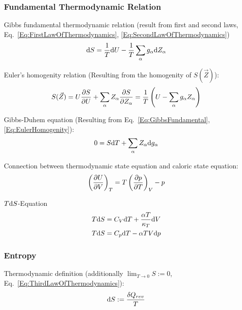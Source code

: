 		\subsubsection{Fundamental Thermodynamic Relation}
			\noindent
			Gibbs fundamental thermodynamic relation (result from first and second laws, Eq.~\ref{Eq:FirstLawOfThermodynamics}, \ref{Eq:SecondLawOfThermodynamics})
			\begin{equation}
				\label{Eq:GibbsFundamental}
				\mathrm{d} S = \frac{1}{T} \mathrm{d} U - \frac{1}{T} \sum_{\alpha} g_\alpha \mathrm{d} Z_\alpha
			\end{equation}

			\noindent
			Euler's homogenity relation (Resulting from the homogenity of $S(\vec{Z})$):
			\begin{equation}
				\label{Eq:EulerHomogenity}
				S(\vec{Z}) = U\frac{\partial S}{\partial U} + \sum_\alpha Z_\alpha\frac{\partial S}{\partial Z_\alpha}
				= \frac{1}{T} \left( U-\sum_\alpha g_\alpha Z_\alpha \right)
			\end{equation}

			\noindent
			Gibbs-Duhem equation (Resulting from Eq.~\ref{Eq:GibbsFundamental}, \ref{Eq:EulerHomogenity}):
			\begin{equation}
				0 = S \mathrm{d} T + \sum_\alpha Z_\alpha \mathrm{d} g_\alpha
			\end{equation}

			\noindent
			Connection between thermodynamic state equation and caloric state equation:
			\begin{equation}
				\left(\frac{\partial U}{\partial V}\right)_T = T\left(\frac{\partial p}{\partial T}\right)_V - p
			\end{equation}

			\noindent
			$T \mathrm{d} S$-Equation
			\begin{equation}
				\begin{aligned}
					T \mathrm{d} S &= C_V \mathrm{d} T + \frac{\alpha T}{\kappa_T} \mathrm{d} V \\
					T \mathrm{d} S &= C_p \mathrm{d} T - \alpha T V \mathrm{d} p
				\end{aligned}
			\end{equation}

		\subsubsection{Entropy}
			\noindent
			Thermodynamic definition (additionally $\lim_{T\rightarrow 0} S := 0$, Eq.~\ref{Eq:ThirdLawOfThermodynamics}):
			\begin{equation}
				\mathrm{d} S := \frac{\delta Q_{rev}}{T}
			\end{equation}

